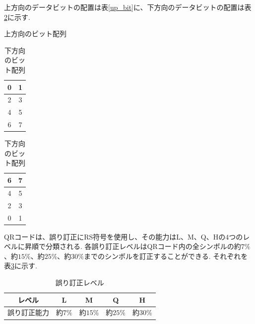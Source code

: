 \documentclass{thesis}
\begin{document}
上方向のデータビットの配置は表\ref{up_bit}に、下方向のデータビットの配置は表\ref{down_bit}に示す.

\begin{table}[h]
  \begin{minipage}[t]{.45\textwidth}
    \begin{center}
	\caption{上方向のビット配列 \label{up_bit}}
      \begin{tabular}{|c|c|} \hline
	0&1\\ \hline
	2&3\\ \hline
	4&5\\ \hline
	6&7\\ \hline
      \end{tabular}
    \end{center}
  \end{minipage}
  \hfill
  \begin{minipage}[t]{.55\textwidth}
    \begin{center}
	\caption{下方向のビット配列 \label{down_bit}}
      \begin{tabular}{|c|c|} \hline
	6&7\\ \hline
	4&5\\ \hline
	2&3\\ \hline
	0&1\\ \hline
      \end{tabular}
    \end{center}
  \end{minipage}
\end{table}

QRコードは、誤り訂正にRS符号を使用し、その能力はL、M、Q、Hの$4$つのレベルに昇順で分類される.
各誤り訂正レベルはQRコード内の全シンボルの約$7\%$、約$15\%$、約$25\%$、約$30\%$までのシンボルを訂正することができる.
それぞれを表\ref{Correction_ability}に示す.

\begin{table}[htbp]
\begin{center}
  \caption{誤り訂正レベル \label{Correction_ability}}
    \begin{tabular}{|c|c|c|c|c|} \hline
     レベル&L&M&Q&H\\ \hline\hline
     誤り訂正能力&約$7\%$&約$15\%$&約$25\%$&約$30\%$ \\ \hline
    \end{tabular}{}
\end{center}
\end{table}
\end{document}
